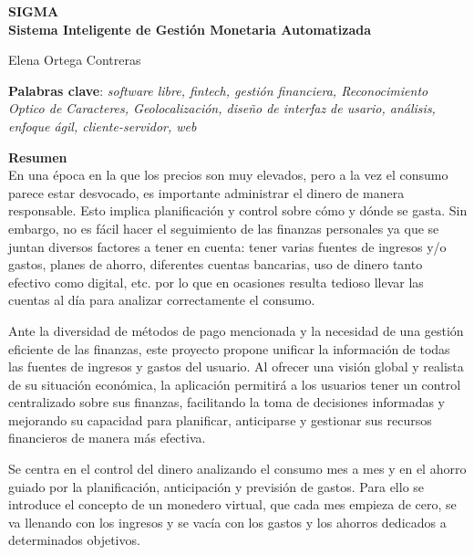 \thispagestyle{empty}

\begin{center}
{\large\bfseries SIGMA \\ Sistema Inteligente de Gestión Monetaria Automatizada }\\
\end{center}
\begin{center}
Elena Ortega Contreras\\
\end{center}


\vspace{0.5cm}
\noindent\textbf{Palabras clave}: \textit{software libre, fintech, gestión financiera, Reconocimiento Optico de Caracteres, Geolocalización, diseño de interfaz de usario, análisis, enfoque ágil, cliente-servidor, web}
\vspace{0.7cm}

\noindent\textbf{Resumen}\\

En una época en la que los precios son muy elevados, pero a la vez el consumo parece estar desvocado, es importante administrar el dinero de manera responsable. Esto implica planificación y control sobre cómo y dónde se gasta.
Sin embargo, no es fácil hacer el seguimiento de las finanzas personales ya que se 
juntan diversos factores a tener en cuenta: tener varias fuentes de ingresos y/o 
gastos, planes de ahorro, diferentes cuentas bancarias, uso de dinero tanto 
efectivo como digital, etc. por lo que en ocasiones resulta tedioso 
llevar las cuentas al día para analizar correctamente el consumo.

Ante la diversidad de métodos de pago mencionada y la necesidad de una gestión eficiente de las finanzas, este proyecto propone unificar la información de todas las fuentes de ingresos y gastos del usuario. Al ofrecer una visión global y realista de su situación económica, la aplicación permitirá a los usuarios tener un control centralizado sobre sus finanzas, facilitando la toma de decisiones informadas y mejorando su capacidad para planificar, anticiparse y gestionar sus recursos financieros de manera más efectiva.

Se centra en el control del dinero analizando el consumo mes a mes y en el ahorro guiado por la planificación, anticipación y previsión de gastos. Para ello se introduce el concepto de un monedero virtual, que cada mes empieza de cero, se va llenando con los ingresos y se vacía con los gastos y los ahorros dedicados a determinados objetivos.	

